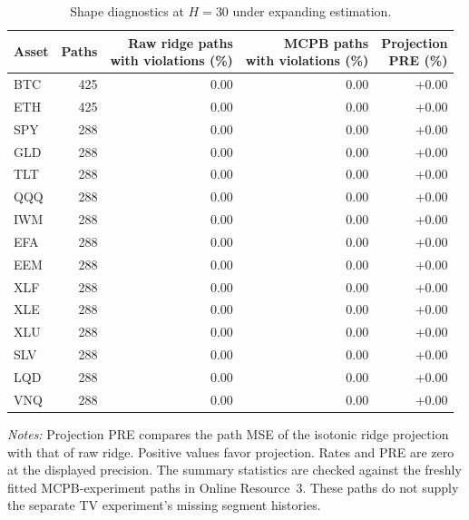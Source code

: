 \begin{table}[!htbp]
\centering\small
\setlength{\tabcolsep}{4pt}
\renewcommand{\arraystretch}{1.09}
\caption{Shape diagnostics at $H=30$ under expanding estimation.}
\label{tab:current_shape}
\begin{tabular}{lrrrr}
\toprule
Asset & Paths & \shortstack{Raw ridge paths\\with violations (\%)} & \shortstack{MCPB paths\\with violations (\%)} & \shortstack{Projection\\PRE (\%)} \\
\midrule
BTC & 425 & 0.00 & 0.00 & +0.00 \\
ETH & 425 & 0.00 & 0.00 & +0.00 \\
SPY & 288 & 0.00 & 0.00 & +0.00 \\
GLD & 288 & 0.00 & 0.00 & +0.00 \\
TLT & 288 & 0.00 & 0.00 & +0.00 \\
QQQ & 288 & 0.00 & 0.00 & +0.00 \\
IWM & 288 & 0.00 & 0.00 & +0.00 \\
EFA & 288 & 0.00 & 0.00 & +0.00 \\
EEM & 288 & 0.00 & 0.00 & +0.00 \\
XLF & 288 & 0.00 & 0.00 & +0.00 \\
XLE & 288 & 0.00 & 0.00 & +0.00 \\
XLU & 288 & 0.00 & 0.00 & +0.00 \\
SLV & 288 & 0.00 & 0.00 & +0.00 \\
LQD & 288 & 0.00 & 0.00 & +0.00 \\
VNQ & 288 & 0.00 & 0.00 & +0.00 \\
\bottomrule
\end{tabular}
\par\smallskip
\begin{minipage}{0.98\linewidth}\footnotesize
\textit{Notes:} Projection PRE compares the path MSE of the isotonic ridge projection with that of raw ridge. Positive values favor projection. Rates and PRE are zero at the displayed precision. The summary statistics are checked against the freshly fitted MCPB-experiment paths in Online Resource~3. These paths do not supply the separate TV experiment's missing segment histories.
\end{minipage}
\end{table}
